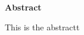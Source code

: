 \newenvironment{abstract}%
    {\null\vfill\begin{center}%
    \bfseries Abstract\end{center}}%
    {\vfill\null}
        \begin{abstract}
        This is the abstractt
        \end{abstract}